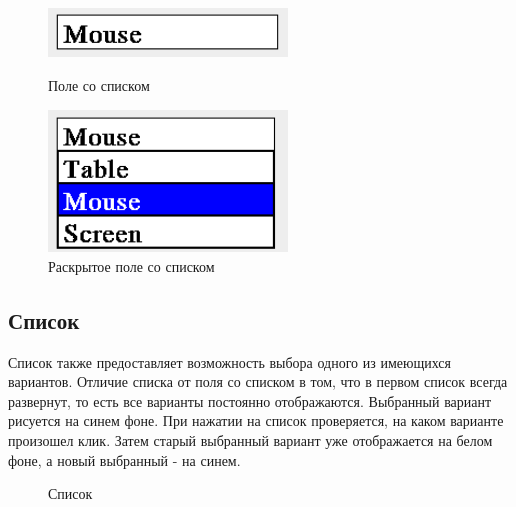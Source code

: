 \documentclass[14pt]{extarticle}
\begin{document}
		\begin{figure}[h]
		\begin{center}
		\begin{minipage}[h]{0.4\linewidth}
		\includegraphics[width=180pt]{pictures/comboBox1.png}
		\caption{ Поле со списком} %
		\label{ris:b1} %
		\end{minipage}
		\hfill 
		\begin{minipage}[h]{0.4\linewidth}
		\includegraphics[width=180pt]{pictures/comboBox2.png}
		\caption{Раскрытое поле со списком}
		\label{ris:b2}
		\end{minipage}
		\end{center}
		\end{figure}
		
	\subsection*{Список}
	Список также предоставляет возможность выбора одного из имеющихся вариантов. Отличие списка от поля со списком в том, что в первом список всегда развернут, то есть все варианты постоянно отображаются. Выбранный вариант рисуется на синем фоне. При нажатии на список проверяется, на каком варианте произошел клик. Затем старый выбранный вариант уже отображается на белом фоне, а новый выбранный - на синем. 
		\begin{figure}[h]
		\caption{Список}
		\label{ris:image}
		\end{figure}	
	
\end{document}
